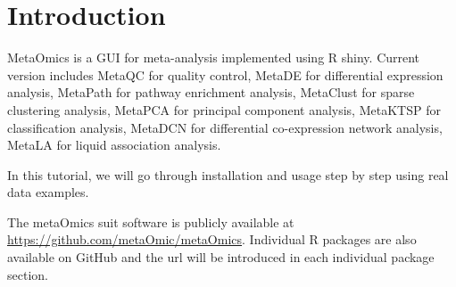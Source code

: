 \section{Introduction}
 
MetaOmics is a GUI for meta-analysis implemented using R shiny.
Current version includes MetaQC for quality control, 
MetaDE for differential expression analysis,
MetaPath for pathway enrichment analysis,
MetaClust for sparse clustering analysis,
MetaPCA for principal component analysis,
MetaKTSP for classification analysis,
MetaDCN for differential co-expression network analysis,
MetaLA for liquid association analysis.

In this tutorial, 
we will go through installation and usage step by step using real data examples.

The metaOmics suit software is publicly available at \url{https://github.com/metaOmic/metaOmics}.
Individual R packages are also available on GitHub and the url will be introduced in each individual package section.

